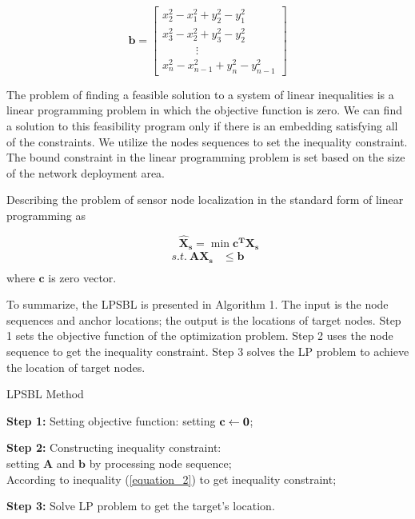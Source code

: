 \[\bm {b}=
\left[
\begin{array}{lcr}
x_2^2-x_1^2+y_2^2-y_1^2 \\
x_3^2-x_2^2+y_3^2-y_2^2 \\
  \quad \quad \quad  \vdots \\
x_n^2-x_{n-1}^2+y_n^2-y_{n-1}^2
\end{array}
\right]
\]


The problem of finding a feasible solution to a system of linear inequalities is a linear programming
problem in which the objective function is zero. 
We can find a solution to this feasibility program only if there is an embedding satisfying all of the constraints. 
We utilize the nodes sequences to set the inequality constraint.
The bound constraint in the linear programming problem is set based on the size of the network deployment area.

Describing the problem of sensor node localization in the standard form of linear programming as

 \begin{equation} \label{6}
 \quad \quad \bm {\hat X_s} = \min {\bm{c^T}\bm{X_s}}
  \end{equation}
\begin{align*}
 s.t. \   \bm {{A}{X_s}} &\le \bm {b} \\
\end{align*}
where $\bm {c}$ is zero vector.

To summarize, the LPSBL is presented in Algorithm 1. 
The input is the node sequences and anchor locations; the output is the locations of target nodes. 
Step 1 sets the objective function of the optimization problem. 
Step 2 uses the node sequence to get the inequality constraint. 
Step 3 solves the LP problem to achieve the location of target nodes.
\begin{algorithm}
\caption{LPSBL Method}

\textbf{Step 1:} Setting objective function: setting $\bf{c} \leftarrow \bf{0}$;

\textbf{Step 2:} Constructing inequality constraint: \\ 
\hspace{0.41in} setting $\bm{A}$ and $\bm{b}$ by processing node sequence;\\
{
{
According to inequality (\ref{equation_2}) to get inequality constraint;
}
}

\textbf{Step 3:} Solve LP problem to get the target's location.

\end{algorithm}


